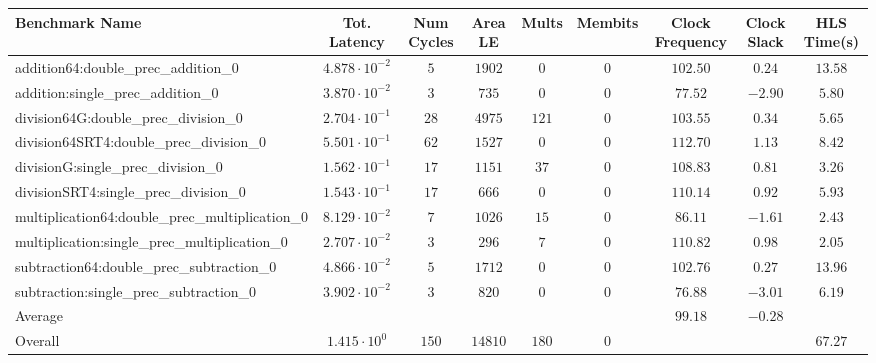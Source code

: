 \begin{tabular}{|l|c|c|c|c|c|c|c|c|}
\hline
Benchmark Name                                   & Tot. Latency            & Num Cycles & Area LE   & Mults   & Membits & Clock Frequency & Clock Slack & HLS Time(s) \\
\hline
addition64:double\_prec\_addition\_0             & $ 4.878 \cdot 10^{-2} $ & $ 5      $ & $ 1902  $ & $ 0   $ & $ 0   $ & $ 102.50      $ & $ 0.24    $ & $ 13.58   $ \\
addition:single\_prec\_addition\_0               & $ 3.870 \cdot 10^{-2} $ & $ 3      $ & $ 735   $ & $ 0   $ & $ 0   $ & $ 77.52       $ & $ -2.90   $ & $ 5.80    $ \\
division64G:double\_prec\_division\_0            & $ 2.704 \cdot 10^{-1} $ & $ 28     $ & $ 4975  $ & $ 121 $ & $ 0   $ & $ 103.55      $ & $ 0.34    $ & $ 5.65    $ \\
division64SRT4:double\_prec\_division\_0         & $ 5.501 \cdot 10^{-1} $ & $ 62     $ & $ 1527  $ & $ 0   $ & $ 0   $ & $ 112.70      $ & $ 1.13    $ & $ 8.42    $ \\
divisionG:single\_prec\_division\_0              & $ 1.562 \cdot 10^{-1} $ & $ 17     $ & $ 1151  $ & $ 37  $ & $ 0   $ & $ 108.83      $ & $ 0.81    $ & $ 3.26    $ \\
divisionSRT4:single\_prec\_division\_0           & $ 1.543 \cdot 10^{-1} $ & $ 17     $ & $ 666   $ & $ 0   $ & $ 0   $ & $ 110.14      $ & $ 0.92    $ & $ 5.93    $ \\
multiplication64:double\_prec\_multiplication\_0 & $ 8.129 \cdot 10^{-2} $ & $ 7      $ & $ 1026  $ & $ 15  $ & $ 0   $ & $ 86.11       $ & $ -1.61   $ & $ 2.43    $ \\
multiplication:single\_prec\_multiplication\_0   & $ 2.707 \cdot 10^{-2} $ & $ 3      $ & $ 296   $ & $ 7   $ & $ 0   $ & $ 110.82      $ & $ 0.98    $ & $ 2.05    $ \\
subtraction64:double\_prec\_subtraction\_0       & $ 4.866 \cdot 10^{-2} $ & $ 5      $ & $ 1712  $ & $ 0   $ & $ 0   $ & $ 102.76      $ & $ 0.27    $ & $ 13.96   $ \\
subtraction:single\_prec\_subtraction\_0         & $ 3.902 \cdot 10^{-2} $ & $ 3      $ & $ 820   $ & $ 0   $ & $ 0   $ & $ 76.88       $ & $ -3.01   $ & $ 6.19    $ \\
\hline
Average                                          & $                     $ & $        $ & $       $ & $     $ & $     $ & $ 99.18       $ & $ -0.28   $ & $         $ \\
\hline
Overall                                          & $ 1.415 \cdot 10^{0}  $ & $ 150    $ & $ 14810 $ & $ 180 $ & $ 0   $ & $             $ & $         $ & $ 67.27   $ \\
\hline
\end{tabular}

